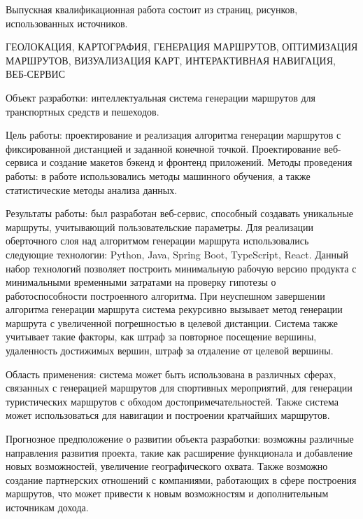 Выпускная квалификационная работа состоит из \pageref*{LastPage} страниц, \totfig рисунков, \tottab использованных источников.

ГЕОЛОКАЦИЯ, КАРТОГРАФИЯ, ГЕНЕРАЦИЯ МАРШРУТОВ, ОПТИМИЗАЦИЯ МАРШРУТОВ, ВИЗУАЛИЗАЦИЯ КАРТ, ИНТЕРАКТИВНАЯ НАВИГАЦИЯ, ВЕБ-СЕРВИС

Объект разработки: интеллектуальная система генерации маршрутов для транспортных средств и пешеходов.

Цель работы: проектирование и реализация алгоритма генерации маршрутов с фиксированной дистанцией и заданной конечной точкой. Проектирование веб-сервиса и создание макетов бэкенд и фронтенд приложений.
Методы проведения работы: в работе использовались методы машинного обучения, а также статистические методы анализа данных.

Результаты работы: был разработан веб-сервис, способный создавать уникальные маршруты, учитывающий пользовательские параметры. Для реализации оберточного слоя над алгоритмом генерации маршрута использовались следующие технологии: Python, Java, Spring Boot, TypeScript, React. Данный набор технологий позволяет построить минимальную рабочую версию продукта с минимальными временными затратами на проверку гипотезы о работоспособности построенного алгоритма. При неуспешном завершении алгоритма генерации маршрута система рекурсивно вызывает метод генерации маршрута с увеличенной погрешностью в целевой дистанции. Система также учитывает такие факторы, как штраф за повторное посещение вершины, удаленность достижимых вершин, штраф за отдаление от целевой вершины.

Область применения: система может быть использована в различных сферах, связанных с генерацией маршрутов для спортивных мероприятий, для генерации туристических маршрутов с обходом достопримечательностей. Также система может использоваться для навигации и построении кратчайших маршрутов.

Прогнозное предположение о развитии объекта разработки: возможны различные направления развития проекта, такие как расширение функционала и добавление новых возможностей, увеличение географического охвата. Также возможно создание партнерских отношений с компаниями, работающих в сфере построения маршрутов, что может привести к новым возможностям и дополнительным источникам дохода.
